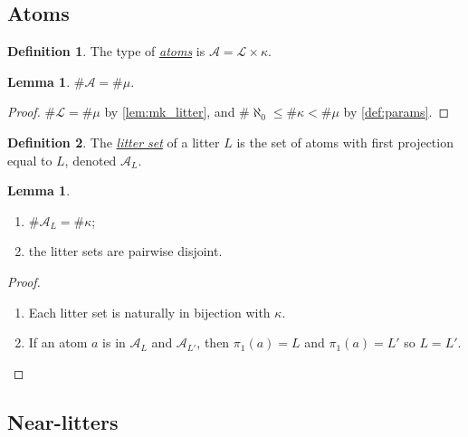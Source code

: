 \documentclass{article}
\newcommand{\cdef}[3]{\href{https://leanprover-community.github.io/con-nf/doc/ConNF/#1.html\#ConNF.#2}{\emph{#3}}}
\theoremstyle{definition}
\newtheorem{definition}{Definition}[section]
\newtheorem{lemma}[theorem]{Lemma}
\theoremstyle{remark}
\begin{document}
\subsection{Atoms}

\begin{definition}
    The type of \cdef{BaseType/Atom}{Atom}{atoms} is \( \mathcal A = \mathcal L \times \kappa \).
\end{definition}
\begin{lemma}
    \label{lem:mk_atom}
    \( \#\mathcal A = \#\mu \).
\end{lemma}
\begin{proof}
    \( \#\mathcal L = \#\mu \) by \cref{lem:mk_litter}, and \( \#\aleph_0 \leq \#\kappa < \#\mu \) by \cref{def:params}.
\end{proof}
\begin{definition}
    The \cdef{BaseType/Atom}{litterSet}{litter set} of a litter \( L \) is the set of atoms with first projection equal to \( L \), denoted \( \mathcal A_L \).
\end{definition}
\begin{lemma}
    \label{lem:litterSet}
    \begin{enumerate}
        \item \( \#\mathcal A_L = \#\kappa \);
        \item the litter sets are pairwise disjoint.
    \end{enumerate}
\end{lemma}
\begin{proof}
    \begin{enumerate}
        \item Each litter set is naturally in bijection with \( \kappa \).
        \item If an atom \( a \) is in \( \mathcal A_L \) and \( \mathcal A_{L'} \), then \( \pi_1(a) = L \) and \( \pi_1(a) = L' \) so \( L = L' \).
    \end{enumerate}
\end{proof}

\subsection{Near-litters}
\end{document}
